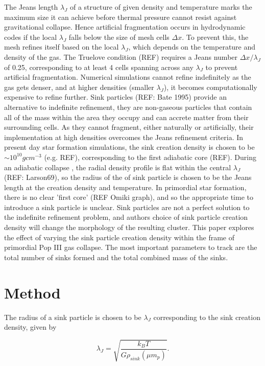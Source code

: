 \documentclass[fleqn,usenatbib]{mnras}
\begin{document}
The Jeans length $\lambda_J$ of a structure of given density and temperature marks the maximum size it can achieve before thermal pressure cannot resist against gravitational collapse. Hence artificial fragmentation occurs in hydrodynamic codes if the local $\lambda_J$ falls below the size of mesh cells $\Delta x$. To prevent this, the mesh refines itself based on the local $\lambda_J$, which depends on the temperature and density of the gas. The Truelove condition (REF) requires a Jeans number $\Delta x/\lambda_J$ of 0.25, corresponding to at least 4 cells spanning across any $\lambda_J$ to prevent artificial fragmentation. Numerical simulations cannot refine indefinitely as the gas gets denser, and at higher densities (smaller $\lambda_J$), it becomes computationally expensive to refine further. Sink particles (REF: Bate 1995) provide an alternative to indefinite refinement, they are non-gaseous particles that contain all of the mass within the area they occupy and can accrete matter from their surrounding cells. As they cannot fragment, either naturally or artificially, their implementation at high densities  overcomes the Jeans refinement criteria. In present day star formation simulations, the sink creation density is chosen to be $\sim 10^{10}gcm^{-3}$ (e.g. REF), corresponding to the first adiabatic core (REF). During an adiabatic collapse , the radial density profile is flat within the central $\lambda_J$ (REF: Larson69), so the radius of the of sink particle is chosen to be the Jeans length at the creation density and temperature. In primordial star formation, there is no clear 'first core' (REF Omiki graph), and so the appropriate time to introduce a sink particle is unclear. Sink particles are not a perfect solution to the indefinite refinement problem, and authors choice of sink particle creation density will change the morphology   of the resulting cluster. This paper explores the effect of varying the sink particle creation density within the frame of primordial Pop III gas collapse. The most important parameters to track are the total number of sinks formed and the total combined mass of the sinks.

\section{Method}

The radius of a sink particle is chosen to be $\lambda_J$ corresponding to the sink creation density, given by


\begin{equation}
    \lambda_J=\sqrt{  \frac{k_B T} {G \rho_{sink} (\mu m_p)}}.
	\label{eq:jeans}
\end{equation}
\end{document}
